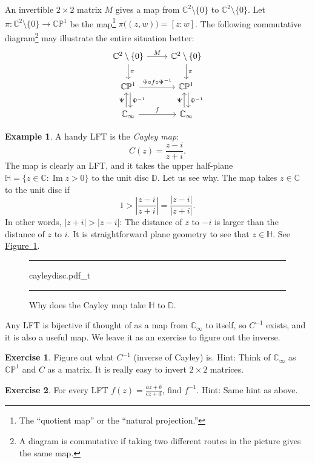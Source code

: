 \documentclass[12pt,openany]{book}
\renewcommand{\Im}{\operatorname{Im}}
\newcommand{\sabs}[1]{\lvert {#1} \rvert}
\newcommand{\abs}[1]{\left\lvert {#1} \right\rvert}
\newcommand{\C}{{\mathbb{C}}}
\newcommand{\D}{{\mathbb{D}}}
\newcommand{\bH}{{\mathbb{H}}}
\newcommand{\bP}{{\mathbb{P}}}
\newcommand{\myindex}[1]{#1\index{#1}}
\newcommand{\myquote}[1]{``#1''}
\theoremstyle{plain}
\theoremstyle{remark}
\theoremstyle{definition}
\newenvironment{exbox}{%
    \def\FrameCommand{\vrule width 1pt \relax\hspace{10pt}}%
    \MakeFramed{\advance\hsize-\width\FrameRestore}%
}{%
    \endMakeFramed
}
\newenvironment{myfig}{%
\begin{figure}[h!t]
\noindent\rule{\textwidth}{0.5pt}\vspace{12pt}\par\centering}%
{\par\noindent\rule{\textwidth}{0.5pt}
\end{figure}}
\theoremstyle{exercise}
\newtheorem{exercise}{Exercise}[section]
\theoremstyle{example}
\newtheorem{example}[thm]{Example}
\newcommand{\figureref}[1]{\hyperref[#1]{Figure~\ref*{#1}}}
\begin{document}
An invertible $2 \times 2$ matrix $M$ gives a map from
$\C^2 \setminus \{ 0 \}$ to $\C^2 \setminus \{ 0 \}$.
Let $\pi \colon \C^2 \setminus \{ 0 \} \to \C \bP^1$ be the map\footnote{The
\myquote{quotient map} or the \myquote{natural projection.}}
$\pi \bigl( (z,w) \bigr) =
[z:w]$.  The following commutative diagram\footnote{A diagram is
commutative if taking two different routes in the picture
gives the same map.}
may
illustrate the entire situation better:
\begin{equation*}
\begin{tikzcd}
\C^2 \setminus \{ 0 \} \arrow[r,"M"] \arrow[d,"\pi"] &
\C^2 \setminus \{ 0 \} \arrow[d,"\pi"] \\
\C \bP^1 \arrow[r,"\Psi \circ f \circ \Psi^{-1}"] \arrow[d,shift left,"\Psi^{-1}"] &
\C \bP^1 \arrow[d,shift left,"\Psi^{-1}"]
\\
\C_\infty \arrow[r,"f"]\arrow[u,shift left,"\Psi"] &
\C_\infty \arrow[u,shift left,"\Psi"]
\end{tikzcd}
\end{equation*}

\begin{example}
A handy LFT is the
\emph{\myindex{Cayley map}}:
\begin{equation*}
C(z)
=
\frac{z - i}{z + i} .
\end{equation*}
The map is clearly an LFT\@, and it
takes the upper half-plane $\bH = \{ z \in \C : \Im z > 0 \}$ to the
unit disc $\D$.  Let us see why.  The map takes $z \in \C$ to the unit disc if
\begin{equation*}
1 > \abs{\frac{z - i}{z + i} }
=
\frac{\sabs{z - i}}{\sabs{z + i}} .
\end{equation*}
In other words, $\sabs{z+i} > \sabs{z - i}$: The distance of $z$
to $-i$ is larger than the distance of $z$ to $i$.  It is straightforward
plane geometry to see that $z \in \bH$.  See
\figureref{fig:cayleydisc}.
\begin{myfig}
{cayleydisc.pdf_t}
\caption{Why does the Cayley map take $\bH$ to $\D$.\label{fig:cayleydisc}}
\end{myfig}
\end{example}

Any LFT is bijective if thought of as a map from $\C_\infty$
to itself, so $C^{-1}$ exists, and it is also a useful map.  We leave
it as an exercise to figure out the inverse.

\begin{exbox}
\begin{exercise}
Figure out what $C^{-1}$ (inverse of Cayley) is.  Hint: Think of $\C_\infty$ as $\C \bP^1$
and $C$ as a matrix.  It is really easy to invert $2 \times 2$ matrices.
\end{exercise}

\begin{exercise}
For every LFT $f(z) = \frac{az+b}{cz+d}$, find $f^{-1}$.
Hint: Same hint as above.
\end{exercise}
\end{exbox}
\end{document}
